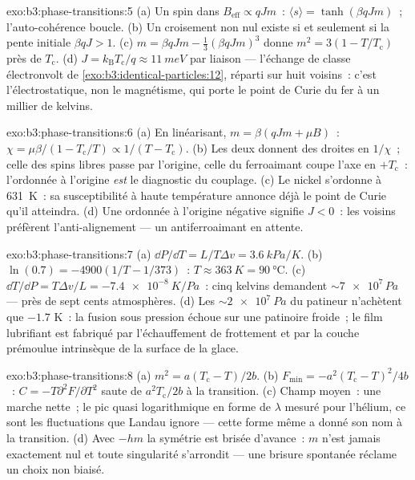 \begin{solution}{exo:b3:phase-transitions:5}
(a) Un spin dans $B_{\text{eff}} \propto qJm$~: $\langle s\rangle =
\tanh(\beta qJm)$~; l'auto-cohérence boucle. (b) Un croisement non
nul existe si et seulement si la pente initiale $\beta qJ > 1$. (c) $m =
\beta qJm - \tfrac13(\beta qJm)^3$ donne $m^2 = 3(1 -
T/T_{\text{c}})$ près de $T_{\text{c}}$. (d) $J =
k_{\text{B}}T_{\text{c}}/q \approx \qty{11}{meV}$ par liaison ---
l'échange de classe électronvolt de
\cref{exo:b3:identical-particles:12}, réparti sur huit voisins~:
c'est l'électrostatique, non le magnétisme, qui porte le point de
Curie du fer à un millier de kelvins.
\end{solution}

\begin{solution}{exo:b3:phase-transitions:6}
(a) En linéarisant, $m = \beta(qJm + \mu B)$~: $\chi =
\mu\beta/(1 - T_{\text{c}}/T) \propto 1/(T - T_{\text{c}})$. (b)
Les deux donnent des droites en $1/\chi$~; celle des spins libres
passe par l'origine, celle du ferroaimant coupe l'axe en
$+T_{\text{c}}$~: l'ordonnée à l'origine \emph{est} le diagnostic
du couplage. (c) Le nickel s'ordonne à \qty{631}{K}~: sa
susceptibilité à haute température annonce déjà le point de Curie
qu'il atteindra. (d) Une ordonnée à l'origine négative signifie
$J < 0$~: les voisins préfèrent l'anti-alignement --- un
antiferroaimant en attente.
\end{solution}

\begin{solution}{exo:b3:phase-transitions:7}
(a) $\dd P/\dd T = L/T\Delta v = \qty{3.6}{kPa/K}$. (b)
$\ln(0.7) = -4900(1/T - 1/373)$~: $T \approx \qty{363}{K} =
\qty{90}{\celsius}$. (c) $\dd T/\dd P = T\Delta v/L =
\qty{-7.4e-8}{K/Pa}$~: cinq kelvins demandent
$\sim\num{7e7}\,\unit{Pa}$ --- près de sept cents atmosphères. (d)
Les $\sim\qty{2e7}{Pa}$ du patineur n'achètent que $-1.7$ K~: la
fusion sous pression échoue sur une patinoire froide~; le film
lubrifiant est fabriqué par l'échauffement de frottement et par la
couche prémoulue intrinsèque de la surface de la glace.
\end{solution}

\begin{solution}{exo:b3:phase-transitions:8}
(a) $m^2 = a(T_{\text{c}} - T)/2b$. (b) $F_{\min} =
-a^2(T_{\text{c}} - T)^2/4b$~: $C = -T\partial^2F/\partial T^2$
saute de $a^2T_{\text{c}}/2b$ à la transition. (c) Champ moyen~:
une marche nette~; le pic quasi logarithmique en forme de $\lambda$
mesuré pour l'hélium, ce sont les fluctuations que Landau ignore ---
cette forme même a donné son nom à la transition. (d) Avec $-hm$ la
symétrie est brisée d'avance~: $m$ n'est jamais exactement nul et
toute singularité s'arrondit --- une brisure spontanée réclame un
choix non biaisé.
\end{solution}

